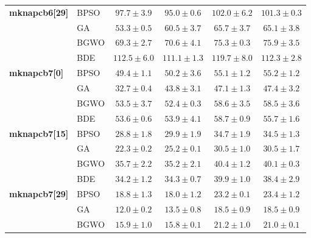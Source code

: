 \begin{table}[htbp]
\begin{tabular*}{\textwidth}{@{\extracolsep{\fill}}llcccc@{}}
    \textbf{mknapcb6[29]} & BPSO  &           $97.7 \pm 3.9$ &  $\mathbf{95.0 \pm 0.6}$ &          $102.0 \pm 6.2$ &          $101.3 \pm 0.3$ \\
                       & GA    &  $\mathbf{53.3 \pm 0.5}$ &           $60.5 \pm 3.7$ &           $65.7 \pm 3.7$ &           $65.1 \pm 3.8$ \\
                       & BGWO  &  $\mathbf{69.3 \pm 2.7}$ &           $70.6 \pm 4.1$ &           $75.3 \pm 0.3$ &           $75.9 \pm 3.5$ \\
                       & BDE   &          $112.5 \pm 6.0$ & $\mathbf{111.1 \pm 1.3}$ &          $119.7 \pm 8.0$ &          $112.3 \pm 2.8$ \\
    \midrule
    \textbf{mknapcb7[0]} & BPSO  &  $\mathbf{49.4 \pm 1.1}$ &           $50.2 \pm 3.6$ &           $55.1 \pm 1.2$ &           $55.2 \pm 1.2$ \\
                       & GA    &  $\mathbf{32.7 \pm 0.4}$ &           $43.8 \pm 3.1$ &           $47.1 \pm 1.3$ &           $47.4 \pm 3.2$ \\
                       & BGWO  &           $53.5 \pm 3.7$ &  $\mathbf{52.4 \pm 0.3}$ &           $58.6 \pm 3.5$ &           $58.5 \pm 3.6$ \\
                       & BDE   &  $\mathbf{53.6 \pm 0.6}$ &           $53.9 \pm 4.1$ &           $58.7 \pm 0.9$ &           $55.7 \pm 1.6$ \\
    \midrule
    \textbf{mknapcb7[15]} & BPSO  &  $\mathbf{28.8 \pm 1.8}$ &           $29.9 \pm 1.9$ &           $34.7 \pm 1.9$ &           $34.5 \pm 1.3$ \\
                       & GA    &  $\mathbf{22.3 \pm 0.2}$ &           $25.2 \pm 0.1$ &           $30.5 \pm 1.0$ &           $30.5 \pm 1.7$ \\
                       & BGWO  &           $35.7 \pm 2.2$ &  $\mathbf{35.2 \pm 2.1}$ &           $40.4 \pm 1.2$ &           $40.1 \pm 0.3$ \\
                       & BDE   &  $\mathbf{34.2 \pm 1.2}$ &           $34.3 \pm 0.7$ &           $39.9 \pm 1.0$ &           $38.4 \pm 2.9$ \\
    \midrule
    \textbf{mknapcb7[29]} & BPSO  &           $18.8 \pm 1.3$ &  $\mathbf{18.0 \pm 1.2}$ &           $23.2 \pm 0.1$ &           $23.4 \pm 1.2$ \\
                       & GA    &  $\mathbf{12.0 \pm 0.2}$ &           $13.5 \pm 0.8$ &           $18.5 \pm 0.9$ &           $18.5 \pm 0.9$ \\
                       & BGWO  &           $15.9 \pm 1.0$ &  $\mathbf{15.8 \pm 0.1}$ &           $21.2 \pm 1.0$ &           $21.0 \pm 0.1$ \\

\end{tabular*}
\end{table}
